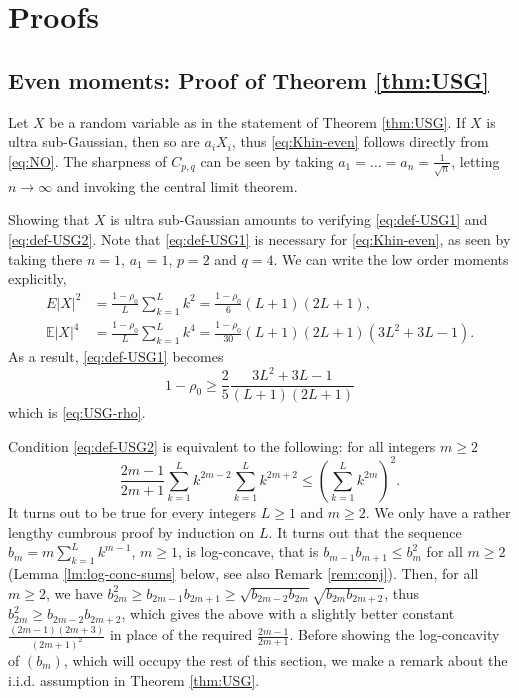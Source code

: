 \documentclass[10pt]{article}
\newcommand{\E}{\mathbb{E}}
\newcommand{\1}{\textbf{1}}
\theoremstyle{remark}
\theoremstyle{definition}
\begin{document}
\section{Proofs}


\subsection{Even moments: Proof of Theorem \ref{thm:USG}}


Let $X$ be a random variable as in the statement of Theorem \ref{thm:USG}. If $X$ is ultra sub-Gaussian, then so are $a_iX_i$, thus \eqref{eq:Khin-even} follows directly from \eqref{eq:NO}. The sharpness of $C_{p,q}$ can be seen by taking $a_1 = \dots = a_n = \frac{1}{\sqrt{n}}$, letting $n\to \infty$ and invoking the central limit theorem.

Showing that $X$ is ultra sub-Gaussian amounts to verifying \eqref{eq:def-USG1} and \eqref{eq:def-USG2}. Note that \eqref{eq:def-USG1} is necessary for \eqref{eq:Khin-even}, as seen by taking there $n=1$, $a_1 = 1$, $p = 2$ and $q=4$. We can write the low order moments explicitly,
\begin{align*}
E|X|^2 &= \frac{1-\rho_0}{L}\sum_{k=1}^L k^2 = \frac{1-\rho_0}{6}(L+1)(2L+1), \\
\E|X|^4 &= \frac{1-\rho_0}{L}\sum_{k=1}^L k^4 = \frac{1-\rho_0}{30}(L+1)(2L+1)(3L^2+3L-1).
\end{align*}
As a result, \eqref{eq:def-USG1} becomes
\[
1-\rho_0 \geq \frac{2}{5}\frac{3L^2+3L-1}{(L+1)(2L+1)}
\]
which is \eqref{eq:USG-rho}.

Condition \eqref{eq:def-USG2} is equivalent to the following: for all integers $m \geq 2$
\[
\frac{2m-1}{2m+1}\sum_{k=1}^L k^{2m-2} \sum_{k=1}^L k^{2m+2} \leq \left(\sum_{k=1}^L k^{2m}\right)^2.
\]
It turns out to be true for every integers $L \geq 1$ and $m \geq 2$. We only have a rather lengthy cumbrous proof by induction on $L$. It turns out that the sequence $b_m = m\sum_{k=1}^L k^{m-1}$, $m \geq 1$, is log-concave, that is $b_{m-1}b_{m+1} \leq b_m^2$ for all $m \geq 2$ (Lemma \ref{lm:log-conc-sums} below, see also Remark \ref{rem:conj}). Then, for all $m \geq 2$, we have $b_{2m}^2 \geq b_{2m-1}b_{2m+1} \geq \sqrt{b_{2m-2}b_{2m}}\sqrt{b_{2m}b_{2m+2}}$, thus $b_{2m}^2 \geq b_{2m-2}b_{2m+2}$, which gives the above with a slightly better constant $\frac{(2m-1)(2m+3)}{(2m+1)^2}$ in place of the required $\frac{2m-1}{2m+1}$. Before showing the log-concavity of $(b_m)$, which will occupy the rest of this section, we make a remark about the i.i.d. assumption in Theorem \ref{thm:USG}.
\end{document}
